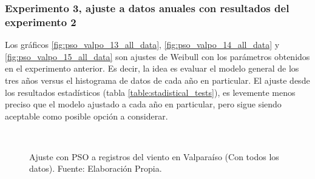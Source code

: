 \subsubsection{Experimento 3, ajuste a datos anuales con resultados del experimento 2}
Los gráficos \ref{fig:pso_valpo_13_all_data}, \ref{fig:pso_valpo_14_all_data} y \ref{fig:pso_valpo_15_all_data} son ajustes de Weibull con los parámetros obtenidos en el experimento anterior. Es decir, la idea es evaluar el modelo general de los tres años versus el histograma de datos de cada año en particular.
El ajuste desde los resultados estadísticos (tabla \ref{table:stadistical_tests}), es levemente menos preciso que el modelo ajustado a cada año en particular, pero sigue siendo aceptable como posible opción a considerar.
\begin{figure}[ht!]
    \centering
    \\   

    \caption{Ajuste con PSO a registros del viento en Valparaíso (Con todos los datos). Fuente: Elaboración Propia.}
    \label{fig:subfigures}
\end{figure}

